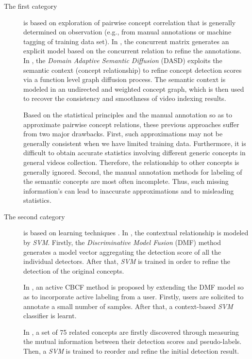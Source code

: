 	\begin{description}
		\item[The first category] is based on exploration of pairwise concept correlation 
		\citep{Jiang2009,Wei2009,Zha2007} that is generally determined on observation
		(e.g., from manual annotations or machine tagging of training data set). 
		In \cite{Zha2007}, the concurrent matrix generates an explicit model based on
		the concurrent relation to refine the annotations. In \citep{Jiang2009}, the \emph{Domain 
		Adaptive Semantic Diffusion} (DASD) exploits the semantic context (concept relationship) 
		to refine concept detection scores via a function level graph diffusion process. The semantic 
		context is modeled in an undirected and weighted concept graph, which is then used to recover 
		the consistency and smoothness of video indexing results.

		Based on the statistical principles and the manual annotation so as to approximate pairwise
		concept relations, these previous approaches suffer from two major drawbacks. First, 
		such approximations may not be generally consistent when we have limited training data. 
		Furthermore, it is difficult to obtain accurate statistics involving different generic concepts 
		in general videos collection. Therefore, the relationship to other concepts is generally ignored. 
		Second, the manual annotation methods for labeling of the semantic concepts are most often 
		incomplete. Thus, such missing information's can lead to inaccurate approximations and to 
		misleading statistics.
	
		\item[The second category] is based on learning techniques \citep{Jiang2006, Kennedy2007, Smith2003}. 
		In \citep{Smith2003}, the contextual relationship is modeled by \emph{SVM}.
		Firstly, the \emph{Discriminative Model Fusion} (DMF) method generates a model vector 
		aggregating the detection score of all the individual detectors. 
		After that, \emph{SVM} is trained in order to refine the detection of the original concepts.
		
		In \citep{Jiang2006}, an active CBCF method is proposed by extending the DMF model so as to 
		incorporate active labeling from a user. Firstly, users are solicited to annotate a small 
		number of samples. After that, a context-based  \emph{SVM} classifier is learnt.

		In \citep{Kennedy2007}, a set of 75 related concepts are firstly discovered through measuring 
		the mutual information between their detection scores and pseudo-labels. 
		Then, a \emph{SVM} is trained to reorder and refine the initial detection result. 

	\end{description}
	
